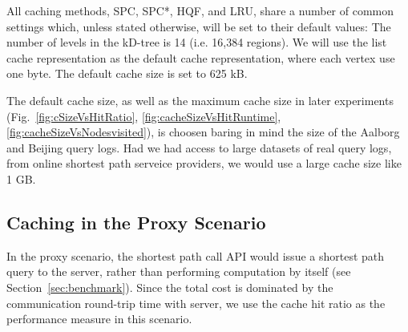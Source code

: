 










All caching methods, SPC, SPC*, HQF, and LRU, share a number of common settings which, unless stated otherwise, will be set to their default values:
The number of levels in the kD-tree is 14 (i.e. 16,384 regions). We will use the list cache representation as the default cache representation, where each vertex use one byte. The default cache size is set to 625 kB.


The default cache size, as well as the maximum cache size in later experiments (Fig.~\ref{fig:cSizeVsHitRatio}, \ref{fig:cacheSizeVsHitRuntime}, \ref{fig:cacheSizeVsNodesvisited}), is choosen baring in mind the size of the Aalborg and Beijing query logs. 
Had we had access to large datasets of real query logs, from online shortest path serveice providers, we would use a large cache size like 1 GB.

% 
% 
% 



\label{fig:cacheSizeVsHitRuntime}

\label{fig:cacheSizeVsNodesvisited}





\subsection{Caching in the Proxy Scenario}\label{subsec:expProxy}
%
In the proxy scenario, the shortest path call API would issue a shortest path query to the server,
rather than performing computation by itself (see Section~\ref{sec:benchmark}).
Since the total cost is dominated by the communication round-trip time with server,
we use the cache hit ratio as the performance measure in this scenario.

